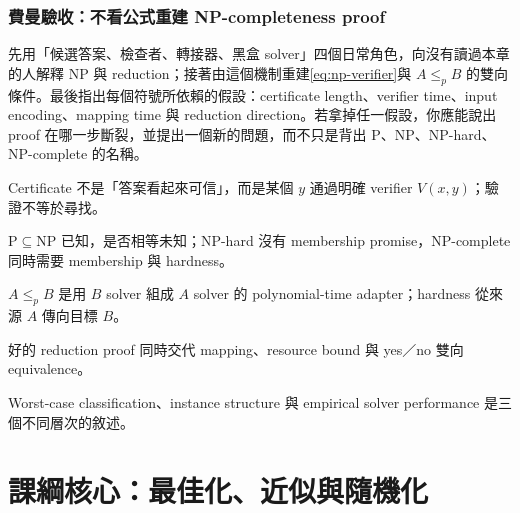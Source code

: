 \documentclass[11pt,a4paper,oneside,openany]{book}
\begin{document}
\section{費曼驗收：不看公式重建 NP-completeness proof}
\begin{feynmancheck}
先用「候選答案、檢查者、轉接器、黑盒 solver」四個日常角色，向沒有讀過本章的人解釋 NP 與 reduction；接著由這個機制重建\cref{eq:np-verifier}與 $A\le_p B$ 的雙向條件。最後指出每個符號所依賴的假設：certificate length、verifier time、input encoding、mapping time 與 reduction direction。若拿掉任一假設，你應能說出 proof 在哪一步斷裂，並提出一個新的問題，而不只是背出 P、NP、NP-hard、NP-complete 的名稱。
\end{feynmancheck}
\begin{chapterrecap}
\item Certificate 不是「答案看起來可信」，而是某個 $y$ 通過明確 verifier $V(x,y)$；驗證不等於尋找。
\item $\mathrm P\subseteq\mathrm{NP}$ 已知，是否相等未知；NP-hard 沒有 membership promise，NP-complete 同時需要 membership 與 hardness。
\item $A\le_p B$ 是用 $B$ solver 組成 $A$ solver 的 polynomial-time adapter；hardness 從來源 $A$ 傳向目標 $B$。
\item 好的 reduction proof 同時交代 mapping、resource bound 與 yes／no 雙向 equivalence。
\item Worst-case classification、instance structure 與 empirical solver performance 是三個不同層次的敘述。
\end{chapterrecap}

\part{課綱核心：最佳化、近似與隨機化}
\end{document}
